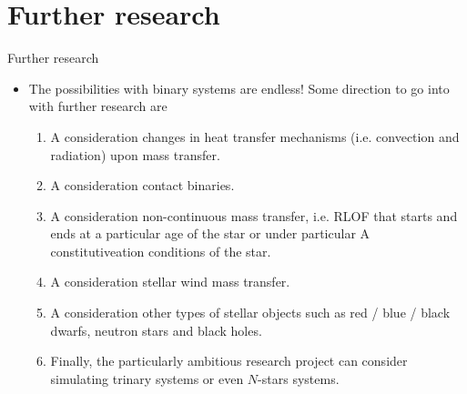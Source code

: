 \documentclass{beamer}
\begin{document}
\section{Further research}
\begin{frame}{Further research}
     \begin{itemize}
         \item<1-> The possibilities with binary systems are endless! Some direction to go into with further research are
         
         \begin{enumerate}
             \item<2-> A consideration changes in heat transfer mechanisms (i.e. convection and radiation) upon mass transfer.
             \item<3-> A consideration contact binaries. 
             \item<4-> A consideration non-continuous mass transfer, i.e. RLOF that starts and ends at a particular age of the star or under particular A constitutiveation conditions of the star.
             \item<5-> A consideration stellar wind mass transfer.
             \item<6-> A consideration other types of stellar objects such as red / blue / black dwarfs, neutron stars and black holes.
             \item<7-> Finally, the particularly ambitious research project can consider simulating trinary systems or even $N$-stars systems.
             \end{enumerate}
     \end{itemize}
\end{frame}

\begin{frame}
    
    
\end{frame}
\end{document}

